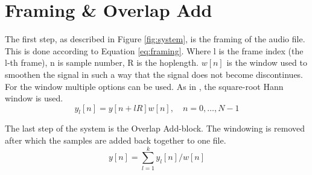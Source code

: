 \section{Framing \& Overlap Add} \label{sec:framing_overlap_add}

The first step, as described in Figure \ref{fig:system}, is the framing of the audio file. This is done according to Equation \ref{eq:framing}. Where l is the frame index (the l-th frame), n is sample number, R is the hoplength. $w[n]$ is the window used to smoothen the signal in such a way that the signal does not become discontinues. For the window multiple options can be used. As in \cite{Hendriks}, the square-root Hann window is used.
\begin{equation}
  \label{eq:framing}
  y_{l}[n] = y[n + lR]w[n],\quad n=0,\hdots,N-1
\end{equation}

The last step of the system is the Overlap Add-block. The windowing is removed after which the samples are added back together to one file.
\begin{equation}
  \label{eq:overlap_add}
  y[n] =  \sum_{l=1}^{k} y_{l}[n]/w[n]
\end{equation}
